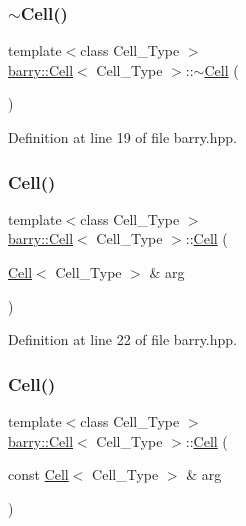 \subsubsection{\texorpdfstring{$\sim$\+Cell()}{~Cell()}}
{\footnotesize\ttfamily template$<$class Cell\+\_\+\+Type $>$ \\
\hyperlink{classbarry_1_1_cell}{barry\+::\+Cell}$<$ Cell\+\_\+\+Type $>$\+::$\sim$\hyperlink{classbarry_1_1_cell}{Cell} (\begin{DoxyParamCaption}{ }\end{DoxyParamCaption})\hspace{0.3cm}{\ttfamily [inline]}}



Definition at line 19 of file barry.\+hpp.

\mbox{\label{classbarry_1_1_cell_a5768e9495f6d7570fdbadf362bc46e3a}} 
\subsubsection{\texorpdfstring{Cell()}{Cell()}\hspace{0.1cm}{\footnotesize\ttfamily [4/6]}}
{\footnotesize\ttfamily template$<$class Cell\+\_\+\+Type $>$ \\
\hyperlink{classbarry_1_1_cell}{barry\+::\+Cell}$<$ Cell\+\_\+\+Type $>$\+::\hyperlink{classbarry_1_1_cell}{Cell} (\begin{DoxyParamCaption}\item[{\hyperlink{classbarry_1_1_cell}{Cell}$<$ Cell\+\_\+\+Type $>$ \&}]{arg }\end{DoxyParamCaption})\hspace{0.3cm}{\ttfamily [inline]}}



Definition at line 22 of file barry.\+hpp.

\mbox{\label{classbarry_1_1_cell_a5db94e6e2ad797d4e9b41e73a3a94e32}} 
\subsubsection{\texorpdfstring{Cell()}{Cell()}\hspace{0.1cm}{\footnotesize\ttfamily [5/6]}}
{\footnotesize\ttfamily template$<$class Cell\+\_\+\+Type $>$ \\
\hyperlink{classbarry_1_1_cell}{barry\+::\+Cell}$<$ Cell\+\_\+\+Type $>$\+::\hyperlink{classbarry_1_1_cell}{Cell} (\begin{DoxyParamCaption}\item[{const \hyperlink{classbarry_1_1_cell}{Cell}$<$ Cell\+\_\+\+Type $>$ \&}]{arg }\end{DoxyParamCaption})\hspace{0.3cm}{\ttfamily [inline]}}



